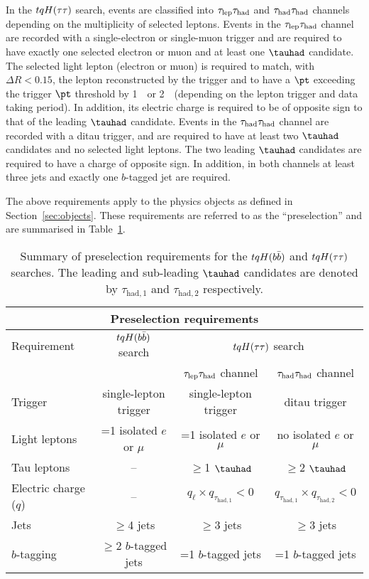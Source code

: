 In the $tqH(\tau\tau)$ search, events are classified into $\tau_{\mathrm{lep}} \tau_{\mathrm{had}}$ and $\tau_{\mathrm{had}} \tau_{\mathrm{had}}$ channels depending on the 
multiplicity of selected leptons. Events in the $\tau_{\mathrm{lep}} \tau_{\mathrm{had}}$ channel are recorded with a single-electron or single-muon trigger 
and are required to have exactly one selected electron or muon and at least one $\tauhad$ candidate. 
The selected light lepton (electron or muon) is required to match, with $\Delta R < 0.15$, the lepton reconstructed by 
the trigger and to have a $\pt$ exceeding the trigger $\pt$ threshold by 1~\gev\ or 2~\gev\ (depending on the lepton trigger and 
data taking period). In addition, its electric charge is required to be of opposite sign to that of the leading $\tauhad$ candidate.
Events in the $\tau_{\mathrm{had}} \tau_{\mathrm{had}}$ channel are recorded with a ditau trigger, and are required to have at least two $\tauhad$ candidates and 
no selected light leptons. The two leading $\tauhad$ candidates are required to have a charge of opposite sign. 
In addition, in both channels at least three jets and exactly one $b$-tagged jet are required.

The above requirements apply to the physics objects as defined in Section~\ref{sec:objects}.
These requirements are referred to as the ``preselection'' and are summarised in Table~\ref{tab:preselection}. 

\begin{table*}[t!]
\begin{center}
\begin{tabular}{l|c|cc}
\toprule\toprule
\multicolumn{4}{c}{Preselection requirements} \\      
\midrule
Requirement &  $tqH(b\bar{b})$ search & \multicolumn{2}{c}{$tqH(\tau\tau)$ search} \\      
& & $\tau_{\mathrm{lep}} \tau_{\mathrm{had}}$ channel & $\tau_{\mathrm{had}} \tau_{\mathrm{had}}$ channel \\
\midrule
Trigger & single-lepton trigger & single-lepton trigger & ditau trigger  \\
Light leptons  & =1 isolated $e$ or $\mu$ & =1 isolated $e$ or $\mu$ & no isolated $e$ or $\mu$ \\
Tau leptons & -- & $\geq$1 $\tauhad$ & $\geq$2 $\tauhad$ \\
Electric charge ($q$) & -- & $q_\ell \times q_{\tau_{\mathrm{had,1}}} < 0$ & $q_{\tau_{\mathrm{had,1}}} \times q_{\tau_{\mathrm{had,2}}} < 0$ \\
Jets  &  $\geq$4 jets & $\geq$3 jets & $\geq$3 jets \\
$b$-tagging & $\geq$2 $b$-tagged jets & =1 $b$-tagged jets & =1 $b$-tagged jets  \\
\bottomrule\bottomrule
\end{tabular}
\caption{\small{Summary of preselection requirements for the $tqH(b\bar{b})$ and $tqH(\tau\tau)$ searches. 
The leading and sub-leading $\tauhad$ candidates are denoted by $\tau_{\mathrm{had,1}}$ and $\tau_{\mathrm{had,2}}$ respectively.}}
\label{tab:preselection}
\end{center}
\end{table*}
